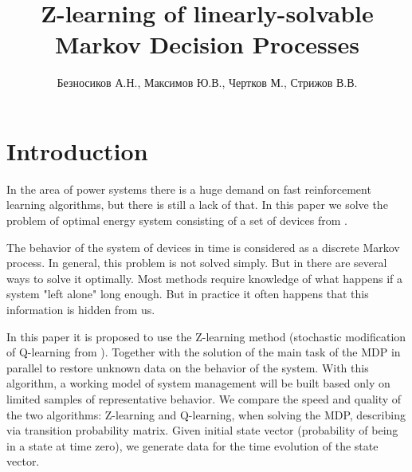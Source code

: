 \documentclass[12pt,twoside]{article}
\title
    [Z-learning of linearly-solvable Markov Decision Processes] %
    {Z-learning of linearly-solvable Markov Decision Processes}
\author
    [Безносиков А.Н.] %
    {Безносиков А.Н., Максимов Ю.В., Чертков М., Стрижов В.В.} %
    [Aleksandr Beznosikov$^1$, Yury Maximov, Michael Chertkov, Vadim Strijov]
\begin{document}
\maketitle

\section{Introduction} 

In the area of power systems there is a huge demand on fast reinforcement learning algorithms, but there is still a lack of that. In this paper we solve the problem of optimal energy system consisting of a set of devices from \cite{Chertkov}.

The behavior of the system of devices in time is considered as a discrete Markov process. In general, this problem is not solved simply. But in \cite{Todorov} there are several ways to solve it optimally. Most methods require knowledge of what happens if a system "left alone" long enough. But in practice it often happens that this information is hidden from us.

In this paper it is proposed to use the Z-learning method (stochastic modification of Q-learning from \cite{Szepesvari,Allen}). Together with the solution of the main task of the MDP in parallel to restore unknown data on the behavior of the system. With this algorithm, a working model of system management will be built based only on limited samples of representative behavior. We compare the speed and quality of the two algorithms: Z-learning and Q-learning, when solving the MDP, describing via transition probability matrix. Given initial state vector (probability of being in a state at time zero), we generate data for the time evolution of the state vector. 





\end{document}
